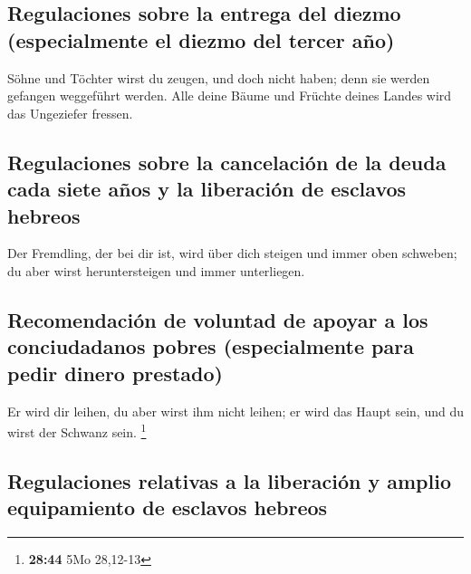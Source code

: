 \hypertarget{regulaciones-sobre-la-entrega-del-diezmo-especialmente-el-diezmo-del-tercer-auxf1o}{%
\subsection{Regulaciones sobre la entrega del diezmo (especialmente el
diezmo del tercer
año)}\label{regulaciones-sobre-la-entrega-del-diezmo-especialmente-el-diezmo-del-tercer-auxf1o}}

 Söhne und Töchter wirst du zeugen, und doch nicht haben;
denn sie werden gefangen weggeführt werden.  Alle deine
Bäume und Früchte deines Landes wird das Ungeziefer fressen.

\hypertarget{regulaciones-sobre-la-cancelaciuxf3n-de-la-deuda-cada-siete-auxf1os-y-la-liberaciuxf3n-de-esclavos-hebreos}{%
\subsection{Regulaciones sobre la cancelación de la deuda cada siete
años y la liberación de esclavos
hebreos}\label{regulaciones-sobre-la-cancelaciuxf3n-de-la-deuda-cada-siete-auxf1os-y-la-liberaciuxf3n-de-esclavos-hebreos}}

 Der Fremdling, der bei dir ist, wird über dich steigen
und immer oben schweben; du aber wirst heruntersteigen und immer
unterliegen.

\hypertarget{recomendaciuxf3n-de-voluntad-de-apoyar-a-los-conciudadanos-pobres-especialmente-para-pedir-dinero-prestado}{%
\subsection{Recomendación de voluntad de apoyar a los conciudadanos
pobres (especialmente para pedir dinero
prestado)}\label{recomendaciuxf3n-de-voluntad-de-apoyar-a-los-conciudadanos-pobres-especialmente-para-pedir-dinero-prestado}}

 Er wird dir leihen, du aber wirst ihm nicht leihen; er
wird das Haupt sein, und du wirst der Schwanz sein. \footnote{\textbf{28:44}
  5Mo 28,12-13}

\hypertarget{regulaciones-relativas-a-la-liberaciuxf3n-y-amplio-equipamiento-de-esclavos-hebreos}{%
\subsection{Regulaciones relativas a la liberación y amplio equipamiento
de esclavos
hebreos}\label{regulaciones-relativas-a-la-liberaciuxf3n-y-amplio-equipamiento-de-esclavos-hebreos}}

